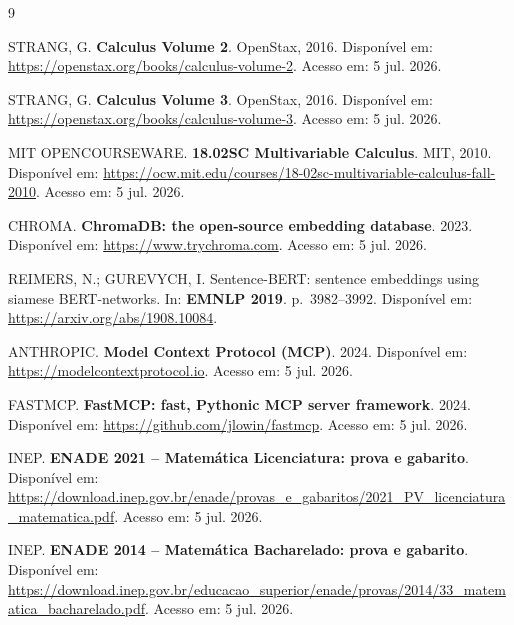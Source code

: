 \documentclass[12pt]{article}
\begin{document}
\begin{thebibliography}{9}

STRANG, G. \textbf{Calculus Volume 2}. OpenStax, 2016. Disponível em:
\url{https://openstax.org/books/calculus-volume-2}. Acesso em: 5 jul. 2026.

STRANG, G. \textbf{Calculus Volume 3}. OpenStax, 2016. Disponível em:
\url{https://openstax.org/books/calculus-volume-3}. Acesso em: 5 jul. 2026.

MIT OPENCOURSEWARE. \textbf{18.02SC Multivariable Calculus}. MIT, 2010. Disponível em:
\url{https://ocw.mit.edu/courses/18-02sc-multivariable-calculus-fall-2010}. Acesso em: 5 jul. 2026.

CHROMA. \textbf{ChromaDB: the open-source embedding database}. 2023. Disponível em:
\url{https://www.trychroma.com}. Acesso em: 5 jul. 2026.

REIMERS, N.; GUREVYCH, I. Sentence-BERT: sentence embeddings using siamese BERT-networks. In:
\textbf{EMNLP 2019}. p.~3982--3992. Disponível em: \url{https://arxiv.org/abs/1908.10084}.

ANTHROPIC. \textbf{Model Context Protocol (MCP)}. 2024. Disponível em:
\url{https://modelcontextprotocol.io}. Acesso em: 5 jul. 2026.

FASTMCP. \textbf{FastMCP: fast, Pythonic MCP server framework}. 2024. Disponível em:
\url{https://github.com/jlowin/fastmcp}. Acesso em: 5 jul. 2026.

INEP. \textbf{ENADE 2021 -- Matemática Licenciatura: prova e gabarito}. Disponível em:
\url{https://download.inep.gov.br/enade/provas_e_gabaritos/2021_PV_licenciatura_matematica.pdf}.
Acesso em: 5 jul. 2026.

INEP. \textbf{ENADE 2014 -- Matemática Bacharelado: prova e gabarito}. Disponível em:
\url{https://download.inep.gov.br/educacao_superior/enade/provas/2014/33_matematica_bacharelado.pdf}.
Acesso em: 5 jul. 2026.

\end{thebibliography}
\end{document}
